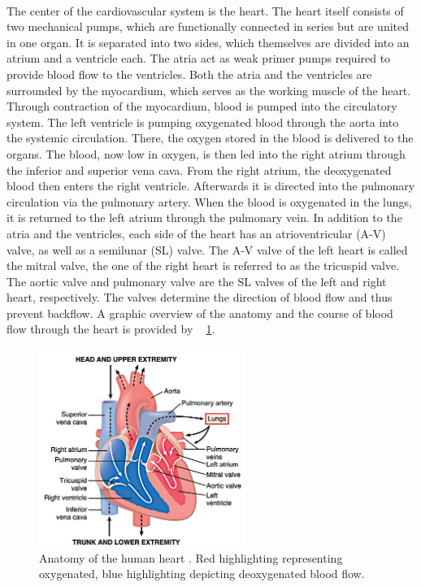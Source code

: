  \\The center of the cardiovascular system is the heart. The heart itself consists of two mechanical pumps, which are functionally connected in series but are united in one organ. It is separated into two sides, which themselves are divided into an atrium and a ventricle each. The atria act as weak primer pumps required to provide blood flow to the ventricles. \cite{HKS4} Both the atria and the ventricles are surrounded by the myocardium, which serves as the working muscle of the heart. Through contraction of the myocardium, blood is pumped into the circulatory system. \cite{HKS7} The left ventricle is pumping oxygenated blood through the aorta into the systemic circulation. There, the oxygen stored in the blood is delivered to the organs. The blood, now low in oxygen, is then led into the right atrium through the inferior and superior vena cava. From the right atrium, the deoxygenated blood then enters the right ventricle. Afterwards it is directed into the pulmonary circulation via the pulmonary artery. When the blood is oxygenated in the lungs, it is returned to the left atrium through the pulmonary vein. \cite{HKS4} In addition to the atria and the ventricles, each side of the heart has an atrioventricular (A-V) valve, as well as a semilunar (SL) valve. The A-V valve of the left heart is called the mitral valve, the one of the right heart is referred to as the tricuspid valve. The aortic valve and pulmonary valve are the SL valves of the left and right heart, respectively. The valves determine the direction of blood flow and thus prevent backflow. \cite{HKS7} A graphic overview of the anatomy and the course of blood flow through the heart is provided by \figurename~ \ref{fig:heart_anat}.
 \begin{figure}[!ht]
   \centering
   \includegraphics[width=0.6\textwidth]{images/heart_1.jpg}
   \caption[Anatomy of the human heart \cite{GH20}]{Anatomy of the human heart \cite{GH20}. Red highlighting representing oxygenated, blue highlighting depicting deoxygenated blood flow.}
   \label{fig:heart_anat}
 \end{figure}

